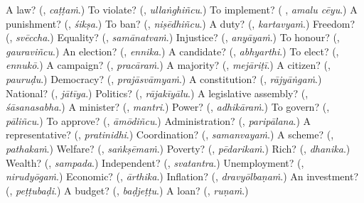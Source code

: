 \begin{tcolorbox}[breakable,colback=teal!4,colframe=teal!35!black,title={Before you move on}]
A law? (\textbf{}, \emph{caṭṭaṁ}.) To violate? (\textbf{}, \emph{ullaṅghiñcu}.) To implement? (\textbf{ }, \emph{amalu cēyu}.) A punishment? (\textbf{}, \emph{śikṣa}.) To ban? (\textbf{}, \emph{niṣēdhiñcu}.) A duty? (\textbf{}, \emph{kartavyaṁ}.) Freedom? (\textbf{}, \emph{svēccha}.) Equality? (\textbf{}, \emph{samānatvaṁ}.) Injustice? (\textbf{}, \emph{anyāyaṁ}.) To honour? (\textbf{}, \emph{gauraviñcu}.) An election? (\textbf{}, \emph{ennika}.) A candidate? (\textbf{}, \emph{abhyarthi}.) To elect? (\textbf{}, \emph{ennukō}.) A campaign? (\textbf{}, \emph{pracāraṁ}.) A majority? (\textbf{}, \emph{mejāriṭī}.) A citizen? (\textbf{}, \emph{pauruḍu}.) Democracy? (\textbf{}, \emph{prajāsvāmyaṁ}.) A constitution? (\textbf{}, \emph{rājyāṅgaṁ}.) National? (\textbf{}, \emph{jātīya}.) Politics? (\textbf{}, \emph{rājakīyālu}.) A legislative assembly? (\textbf{}, \emph{śāsanasabha}.) A minister? (\textbf{}, \emph{mantri}.) Power? (\textbf{}, \emph{adhikāraṁ}.) To govern? (\textbf{}, \emph{pāliñcu}.) To approve? (\textbf{}, \emph{āmōdiñcu}.) Administration? (\textbf{}, \emph{paripālana}.) A representative? (\textbf{}, \emph{pratinidhi}.) Coordination? (\textbf{}, \emph{samanvayaṁ}.) A scheme? (\textbf{}, \emph{pathakaṁ}.) Welfare? (\textbf{}, \emph{saṅkṣēmaṁ}.) Poverty? (\textbf{}, \emph{pēdarikaṁ}.) Rich? (\textbf{}, \emph{dhanika}.) Wealth? (\textbf{}, \emph{sampada}.) Independent? (\textbf{}, \emph{svatantra}.) Unemployment? (\textbf{}, \emph{nirudyōgaṁ}.) Economic? (\textbf{}, \emph{ārthika}.) Inflation? (\textbf{}, \emph{dravyōlbaṇaṁ}.) An investment? (\textbf{}, \emph{peṭṭubaḍi}.) A budget? (\textbf{}, \emph{baḍjeṭṭu}.) A loan? (\textbf{}, \emph{ruṇaṁ}.)
\end{tcolorbox}
